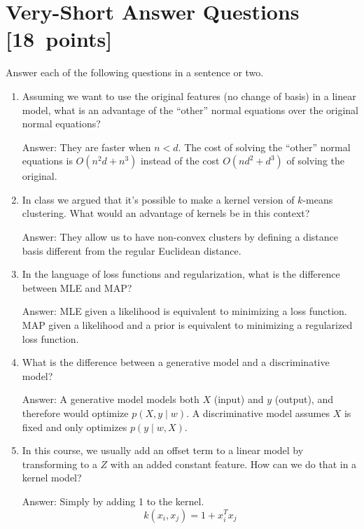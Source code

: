 \documentclass{article}
\newcommand{\blu}[1]{{\textcolor{blu}{#1}}}
\newenvironment{answer}{\par\begingroup\color{gre}Answer: }{\endgroup}
\let\ask\blu
\newcommand\pts[1]{\textcolor{pointscolour}{[#1~points]}}
\begin{document}
\section{Very-Short Answer Questions \pts{18}}
\ask{Answer each of the following questions in a sentence or two.}
\begin{enumerate}
\item Assuming we want to use the original features (no change of basis) in a linear model, what is an advantage of the ``other'' normal equations over the original normal equations?
\begin{answer}
    They are faster when $n < d$. The cost of solving the ``other'' normal equations is $O(n^2 d + n^3)$ instead of the cost $O(nd^2 + d^3)$ of solving the original.
\end{answer}

\item In class we argued that it's possible to make a kernel version of $k$-means clustering. What would an advantage of kernels be in this context?
\begin{answer}
    They allow us to have non-convex clusters by defining a distance basis different from the regular Euclidean distance.
\end{answer}

\item In the language of loss functions and regularization, what is the difference between MLE and MAP?
\begin{answer}
    MLE given a likelihood is equivalent to minimizing a loss function. MAP given a likelihood and a prior is equivalent to minimizing a regularized loss function.
\end{answer}

\item What is the difference between a generative model and a discriminative model?
\begin{answer}
    A generative model models both $X$ (input) and $y$ (output), and therefore would optimize $p(X, y\mid w)$. A discriminative model assumes $X$ is fixed and only optimizes $p(y\mid w, X)$.
\end{answer}

\item In this course, we usually add an offset term to a linear model by transforming to a $Z$ with an added constant feature. How can we do that in a kernel model?
\begin{answer}
    Simply by adding 1 to the kernel.
    \[
        k(x_i, x_j) = 1 + x_i^T x_j
    \]
\end{answer}


\end{enumerate}
\end{document}
